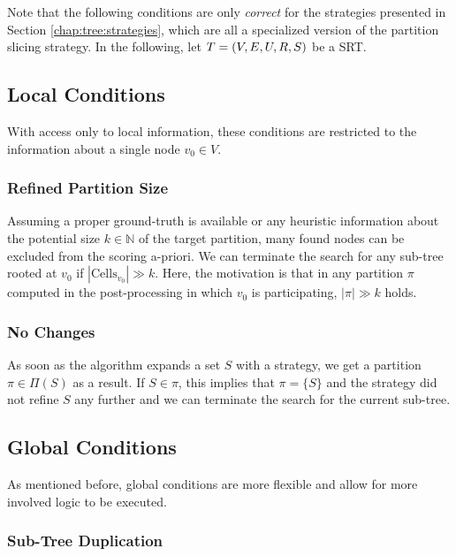 		Note that the following conditions are only \textit{correct} for the strategies presented in Section \ref{chap:tree:strategies}, which are all a specialized version of the partition slicing strategy.
		In the following, let $T = (V, E, U, R, S)$ be a \ac{SRT}.

		\subsection{Local Conditions}

			With access only to local information, these conditions are restricted to the information about a single node $v_0 \in V$.

			\subsubsection{Refined Partition Size}

			Assuming a proper ground-truth is available or any heuristic information about the potential size $k \in \mathbb{N}$ of the target partition, many found nodes can be excluded from the scoring a-priori. 
			We can terminate the search for any sub-tree rooted at $v_0$ if $| \mathrm{Cells}_{v_0} | \gg k$.
			Here, the motivation is that in any partition $\pi$ computed in the post-processing in which $v_0$ is participating, $|\pi| \gg k$ holds.

			\subsubsection{No Changes}

			As soon as the algorithm expands a set $S$ with a strategy, we get a partition $\pi \in \Pi(S)$ as a result.
			If $S \in \pi$, this implies that $\pi = \{ S \}$ and the strategy did not refine $S$ any further and we can terminate the search for the current sub-tree.

		\subsection{Global Conditions}

			As mentioned before, global conditions are more flexible and allow for more involved logic to be executed.

			\subsubsection{Sub-Tree Duplication}

